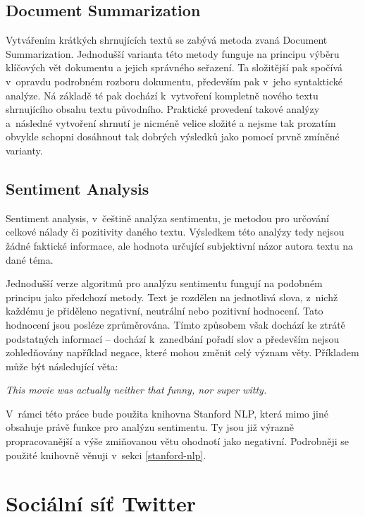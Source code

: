 \documentclass[thesis=B,czech]{FITthesis}[2012/06/26]
\begin{document}
\subsection{Document Summarization}
	Vytvářením krátkých shrnujících textů se zabývá metoda zvaná Document Summarization. Jednodušší varianta této metody funguje na principu výběru klíčových vět dokumentu a jejich správného seřazení. Ta složitější pak spočívá v~opravdu podrobném rozboru dokumentu, především pak v~jeho syntaktické analýze. Ná základě té pak dochází k~vytvoření kompletně nového textu shrnujícího obsahu textu původního. Praktické provedení takové analýzy a~následné vytvoření shrnutí je nicméně velice složité a nejsme tak prozatím obvykle schopni dosáhnout tak dobrých výsledků jako pomocí prvně zmíněné varianty\cite{summarization-quora}. 


\subsection{Sentiment Analysis}
\label{sentiment-analysis}
	Sentiment analysis, v~češtině analýza sentimentu, je metodou pro určování celkové nálady či pozitivity daného textu. Výsledkem této analýzy tedy nejsou žádné faktické informace, ale hodnota určující subjektivní názor autora textu na dané téma. 
	
	Jednodušší verze algoritmů pro analýzu sentimentu fungují na podobném principu jako předchozí metody. Text je rozdělen na jednotlivá slova, z~nichž každému je přiděleno negativní, neutrální nebo pozitivní hodnocení. Tato hodnocení jsou posléze zprůměrována. Tímto způsobem však dochází ke ztrátě podstatných informací -- dochází k~zanedbání pořadí slov a především nejsou zohledňovány například negace, které mohou změnit celý význam věty. Příkladem může být následující věta:

\vspace{\baselineskip}
\textit{This movie was actually neither that funny, nor super witty.}	
\vspace{\baselineskip}

	V~rámci této práce bude použita knihovna Stanford NLP\cite{stanford-nlp-web}, která mimo jiné obsahuje právě funkce pro analýzu sentimentu. Ty jsou již výrazně propracovanější a výše zmiňovanou větu ohodnotí jako negativní. Podrobněji se použité knihovně věnuji v~sekci \ref{stanford-nlp}.


\section{Sociální síť Twitter}
\label{twitter}
	
\end{document}
